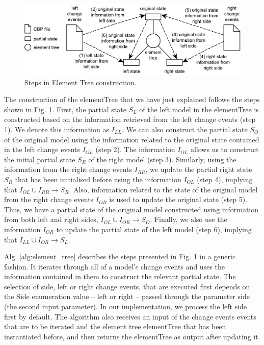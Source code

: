 \documentclass{jot}
\newcommand{\dk}[1]{\textcolor{blue}{\textbf{[Dimitris: #1]}}}
\begin{document}
    \begin{figure}
        \centering
        \includegraphics[width=0.7\linewidth]{TreeConstruction}
        \caption{Steps in Element Tree construction.}
        \label{fig:tree_construction}
    \end{figure} 
    
    The construction of the \textsf{elementTree} that we have just explained follows the steps shown in Fig. \ref{fig:tree_construction}. First, the partial
    state $S_{L}$ of the left model in the \textsf{elementTree} is constructed based on the information retrieved from the left change events (step 1). We denote this information as $I_{LL}$. We can also construct the partial 
    state $S_{O}$ of the original model using the information related to the original state contained in the left change events $I_{OL}$ (step 2). The information $I_{OL}$ allows us to construct the initial partial 
    state $S_{R}$ of the right model 
    (step 3). Similarly, using the information from the right change events $I_{RR}$, we update the partial right state $S_{R}$ that has been initialised before using the information $I_{OL}$ (step 4), implying that $I_{OL} \cup I_{RR} \rightarrow S_{R}$. Also, information related to the state of the original model from the right change events $I_{OR}$ is used to update the original state  (step 5). Thus, we have a partial state of the original model constructed using information from both left and right sides, $I_{OL} \cup I_{OR} \rightarrow S_{O}$. Finally, we also use the information $I_{OR}$ to update the partial state of the left model (step 6), implying that $I_{LL} \cup I_{OR} \rightarrow S_{L}$.  
    
    Alg. \ref{alg:element_tree} describes the steps presented in Fig. \ref{fig:tree_construction} in a generic fashion. It iterates through all of a model's change events and uses the information contained in them to construct the relevant partial state. The selection of side, left or right change events, that are executed first depends on the \textsf{Side} enumeration value -- \textsf{left} or \textsf{right} -- passed through the parameter \textsf{side} (the second input parameter). In our implementation, we process the left side first by default. The algorithm also receives an input of the change events \textsf{events} that are to be iterated and the element tree \textsf{elementTree} that has been instantiated before, and then returns the \textsf{elementTree} as output after updating it.
    
\end{document}
